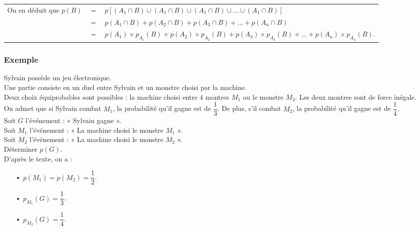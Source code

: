 \begin{tabular}{lll}
\hspace*{-.3cm} On en déduit que $p\left(B\right)$ & $ = $ & $p\left[\left(A_1 \cap B\right) \cup \left(A_1 \cap B\right) \cup \left(A_1 \cap B\right) \cup ... \cup \left(A_1 \cap B\right)\right]$ \\
& $=$ & $p\left(A_1\cap B\right) + p\left(A_2 \cap B\right) + p\left(A_3 \cap B\right) + ... + p\left(A_n \cap B\right)$ \\
& $=$ & $p\left(A_1\right) \times p_{A_1}\left(B\right) + p\left(A_2\right) \times p_{A_2}\left(B\right) + p\left(A_3\right) \times p_{A_3}\left(B\right) + ... + p\left(A_n\right) \times p_{A_n}\left(B\right)$. \\
\end{tabular}

\vspace*{-5cm}

\newpage

\subsubsection{Exemple}

Sylvain possède un jeu électronique. \\ Une partie consiste en un duel entre Sylvain et un monstre choisi par la machine. \\

Deux choix équiprobables sont possibles : la machine choisi entre $4$ montres $M_1$ ou le monstre $M_2$. Les deux montres sont de force inégale. On admet que si Sylvain combat $M_1$, la probabilité qu'il gagne est de $\dfrac{1}{3}$. De plus, s'il combat $M_2$, la probabilité qu'il gagne est de $\dfrac{1}{4}$. \\

Soit $G$ l'événement : « Sylvain gagne ». \\
Soit $M_1$ l'événement : « La machine choisi le monstre $M_1$ ». \\
Soit $M_2$ l'événement : « La machine choisi le monstre $M_2$ ». \\

Déterminer $p\left(G\right)$. \\

D'après le texte, on a : \\

\begin{itemize}
\item[•] $p\left(M_1\right) = p\left(M_2\right) = \dfrac{1}{2}$. \\
\item[•] $p_{M_1}\left(G\right) = \dfrac{1}{3}$. \\
\item[•] $p_{M_2}\left(G\right) = \dfrac{1}{4}$. \\
\end{itemize}

